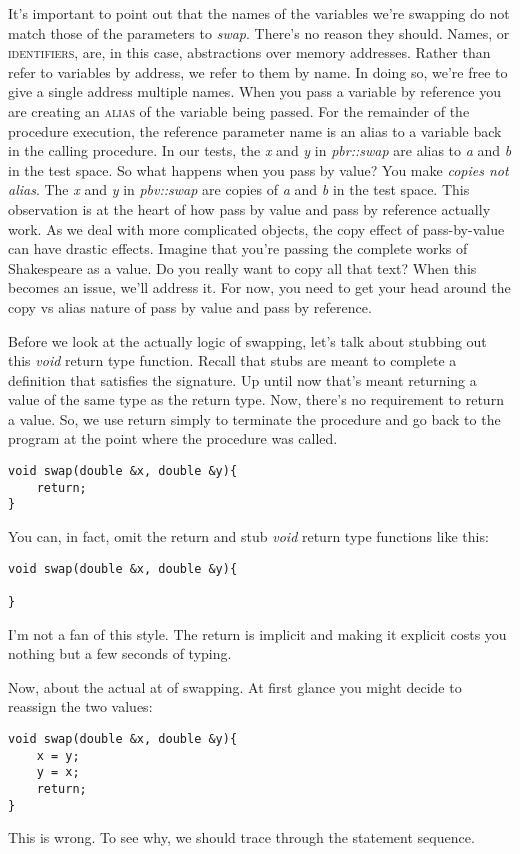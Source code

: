 \documentclass[]{tufte-handout}
\begin{document}
It's important to point out that the names of the variables we're swapping do not match those of the parameters to \textit{swap}. There's no reason they should. Names, or \textsc{identifiers}, are, in this case, abstractions over memory addresses. Rather than refer to variables by address, we refer to them by name. In doing so, we're free to give a single address multiple names. When you pass a variable by reference you are creating an \textsc{alias} of the variable being passed. For the remainder of the procedure execution, the reference parameter name is an alias to a variable back in the calling procedure. In our tests, the \textit{x} and \textit{y} in \textit{pbr::swap} are alias to \textit{a} and \textit{b} in the test space. So what happens when you pass by value? You make \textit{copies not alias}. The \textit{x} and \textit{y} in \textit{pbv::swap} are copies of \textit{a} and \textit{b} in the test space. This observation is at the heart of how pass by value and pass by reference actually work. As we deal with more complicated objects, the copy effect of pass-by-value can have drastic effects. Imagine that you're passing the complete works of Shakespeare as a value. Do you really want to copy all that text? When this becomes an issue, we'll address it. For now, you need to get your head around the copy vs alias nature of pass by value and pass by reference.

Before we look at the actually logic of swapping, let's talk about stubbing out this \textit{void} return type function. Recall that stubs are meant to complete a definition that satisfies the signature. Up until now that's meant returning a value of the same type as the return type.  Now, there's no requirement to return a value.  So, we use return simply to terminate the procedure and go back to the program at the point where the procedure was called.
\begin{verbatim}
void swap(double &x, double &y){
	return;
}
\end{verbatim}
You can, in fact, omit the return and stub \textit{void} return type functions like this:
\begin{verbatim}
void swap(double &x, double &y){

}
\end{verbatim}
I'm not a fan of this style.  The return is implicit and making it explicit costs you nothing but a few seconds of typing. 

Now, about the actual at of swapping.  At first glance you might decide to reassign the two values:
\begin{verbatim}
void swap(double &x, double &y){
	x = y;
	y = x;
	return;
}
\end{verbatim}
This is wrong. To see why, we should trace through the statement sequence. 
\end{document}
